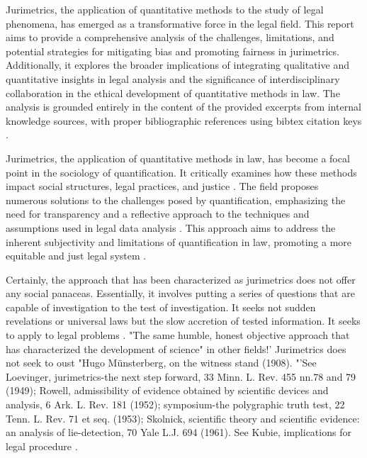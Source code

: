 Jurimetrics, the application of quantitative methods to the study of legal phenomena, has emerged as a transformative force in the legal field. This report aims to provide a comprehensive analysis of the challenges, limitations, and potential strategies for mitigating bias and promoting fairness in jurimetrics. Additionally, it explores the broader implications of integrating qualitative and quantitative insights in legal analysis and the significance of interdisciplinary collaboration in the ethical development of quantitative methods in law. The analysis is grounded entirely in the content of the provided excerpts from internal knowledge sources, with proper bibliographic references using bibtex citation keys \cite{10.20396/rdbci.v18i0.8658889, 10.32586/rcda.v18i1.585, 10.1007/s11186-021-09453-1, demortain2019politics, 10.3390/fi9040068}.

Jurimetrics, the application of quantitative methods in law, has become a focal point in the sociology of quantification. It critically examines how these methods impact social structures, legal practices, and justice \cite{10.20396/rdbci.v18i0.8658889, 10.32586/rcda.v18i1.585}. The field proposes numerous solutions to the challenges posed by quantification, emphasizing the need for transparency and a reflective approach to the techniques and assumptions used in legal data analysis \cite{10.1007/s11186-021-09453-1, demortain2019politics, 10.3390/fi9040068}. This approach aims to address the inherent subjectivity and limitations of quantification in law, promoting a more equitable and just legal system \cite{10.1007/s11186-021-09453-1, demortain2019politics}.

Certainly, the approach that has been characterized as jurimetrics does not offer any social panaceas. Essentially, it involves putting a series of questions that are capable of investigation to the test of investigation. It seeks not sudden revelations or universal laws but the slow accretion of tested information. It seeks to apply to legal problems \cite{1023071190721}. "The same humble, honest objective approach that has characterized the development of science" in other fields!' Jurimetrics does not seek to oust "Hugo Münsterberg, on the witness stand (1908). "'See Loevinger, jurimetrics-the next step forward, 33 Minn. L. Rev. 455 nn.78 and 79 (1949); Rowell, admissibility of evidence obtained by scientific devices and analysis, 6 Ark. L. Rev. 181 (1952); symposium-the polygraphic truth test, 22 Tenn. L. Rev. 71 et seq. (1953); Skolnick, scientific theory and scientific evidence: an analysis of lie-detection, 70 Yale L.J. 694 (1961). See Kubie, implications for legal procedure \cite{1023071190721}.

